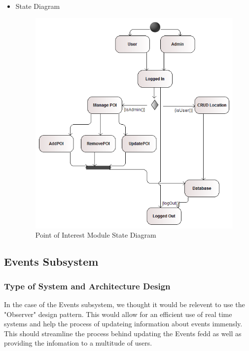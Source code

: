 \documentclass{article}
\begin{document}
\begin{itemize}
 				\item State Diagram
 				\begin{center}
 					\begin{figure}[!h]
 						\includegraphics[scale=0.6]{POI_State_Machine_diagram.png}
 						\caption{Point of Interest Module State Diagram}
 					\end{figure}
 				\end{center}
				
				
			\end{itemize}
		\subsection{Events Subsystem}
		\subsubsection{Type of System and Architecture Design}
				In the case of the Events subsystem, we thought it would be relevent to use the "Observer" design pattern. This would allow for an efficient use of real time systems and help the process of updateing information about events immensly. This should streamline the process behind updating the Events fedd as well as providing the infomation to a multitude of users. 
				
\end{document}
